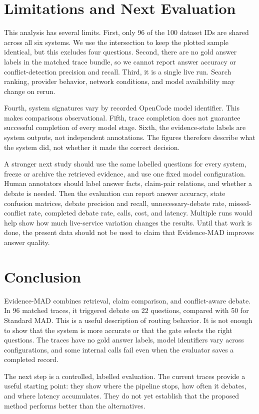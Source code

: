 \documentclass[conference]{IEEEtran}
\begin{document}
\section{Limitations and Next Evaluation}
This analysis has several limits. First, only 96 of the 100 dataset IDs are shared across all six systems. We use the intersection to keep the plotted sample identical, but this excludes four questions. Second, there are no gold answer labels in the matched trace bundle, so we cannot report answer accuracy or conflict-detection precision and recall. Third, it is a single live run. Search ranking, provider behavior, network conditions, and model availability may change on rerun.

Fourth, system signatures vary by recorded OpenCode model identifier. This makes comparisons observational. Fifth, trace completion does not guarantee successful completion of every model stage. Sixth, the evidence-state labels are system outputs, not independent annotations. The figures therefore describe what the system did, not whether it made the correct decision.

A stronger next study should use the same labelled questions for every system, freeze or archive the retrieved evidence, and use one fixed model configuration. Human annotators should label answer facts, claim-pair relations, and whether a debate is needed. Then the evaluation can report answer accuracy, state confusion matrices, debate precision and recall, unnecessary-debate rate, missed-conflict rate, completed debate rate, calls, cost, and latency. Multiple runs would help show how much live-service variation changes the results. Until that work is done, the present data should not be used to claim that Evidence-MAD improves answer quality.

\section{Conclusion}
Evidence-MAD combines retrieval, claim comparison, and conflict-aware debate. In 96 matched traces, it triggered debate on 22 questions, compared with 50 for Standard MAD. This is a useful description of routing behavior. It is not enough to show that the system is more accurate or that the gate selects the right questions. The traces have no gold answer labels, model identifiers vary across configurations, and some internal calls fail even when the evaluator saves a completed record.

The next step is a controlled, labelled evaluation. The current traces provide a useful starting point: they show where the pipeline stops, how often it debates, and where latency accumulates. They do not yet establish that the proposed method performs better than the alternatives.
\end{document}
